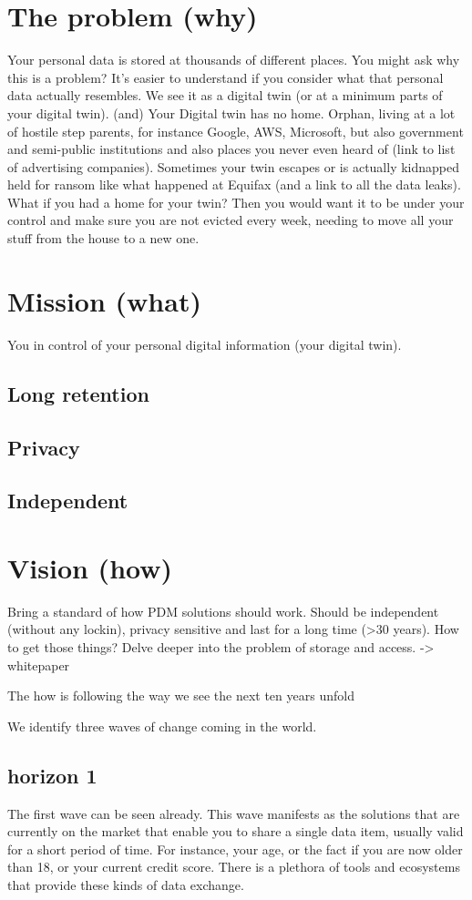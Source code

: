 \documentclass{article}
\begin{document}
\section{The problem (why)}
Your personal data is stored at thousands of different places. You might ask why this is a problem? It's easier to understand if you consider what that personal data actually resembles. We see it as a digital twin (or at a minimum parts of your digital twin).
(and) Your Digital twin has no home. Orphan, living at a lot of hostile step parents, for instance Google, AWS, Microsoft, but also government and semi-public institutions and also places you never even heard of (link to list of advertising companies). Sometimes your twin escapes or is actually kidnapped held for ransom like what happened at Equifax (and a link to all the data leaks). What if you had a home for your twin? Then you would want it to be under your control and make sure you are not evicted every week, needing to move all your stuff from the house to a new one. 

\section{Mission (what)}
You in control of your personal digital information (your digital twin).
\subsection{Long retention}
\subsection{Privacy}
\subsection{Independent}

\section{Vision (how)}
Bring a standard of how PDM solutions should work. Should be independent (without any lockin), privacy sensitive and last for a long time (>30 years). How to get those things? Delve deeper into the problem of storage and access. -> whitepaper

The how is following the way we see the next ten years unfold


We identify three waves of change coming in the world. 

\subsection{horizon 1}
The first wave can be seen already. This wave manifests as the solutions that are currently on the market that enable you to share a single data item, usually valid for a short period of time. For instance, your age, or the fact if you are now older than 18, or your current credit score. There is a plethora of tools and ecosystems that provide these kinds of data exchange.
\end{document}
